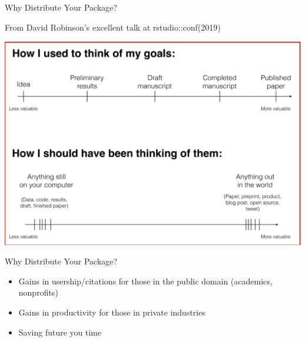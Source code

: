 \documentclass[
  ignorenonframetext,
]{beamer}
\providecommand{\tightlist}{%
  \setlength{\itemsep}{0pt}\setlength{\parskip}{0pt}}
\begin{document}
\begin{frame}{Why Distribute Your Package?}
\protect\hypertarget{why-distribute-your-package}{}

From David Robinson's excellent talk at rstudio::conf(2019)

\includegraphics[width=1\linewidth]{pics/dr}

\end{frame}

\begin{frame}{Why Distribute Your Package?}
\protect\hypertarget{why-distribute-your-package-1}{}

\begin{itemize}
\tightlist
\item
  Gains in usership/citations for those in the public domain (academics,
  nonprofits)
\item
  Gains in productivity for those in private industries
\item
  Saving future you time
\end{itemize}

\end{frame}
\end{document}
